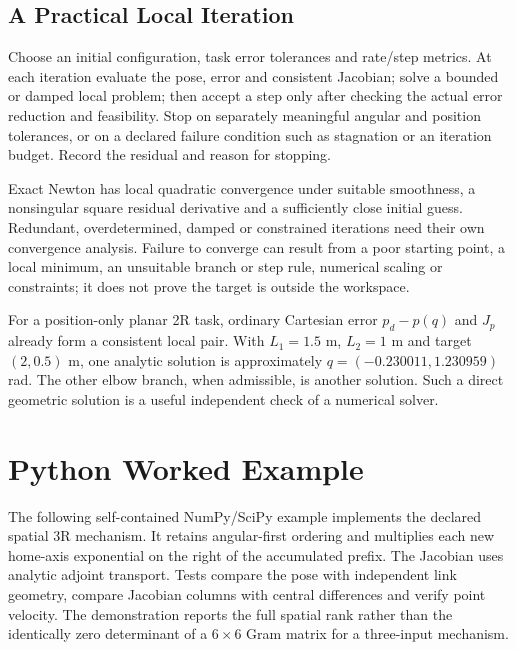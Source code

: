 \subsection{A Practical Local Iteration}
\label{subsec:ik_algorithm}

Choose an initial configuration, task error tolerances and rate/step metrics. At each iteration evaluate the pose, error and consistent Jacobian; solve a bounded or damped local problem; then accept a step only after checking the actual error reduction and feasibility. Stop on separately meaningful angular and position tolerances, or on a declared failure condition such as stagnation or an iteration budget. Record the residual and reason for stopping.

Exact Newton has local quadratic convergence under suitable smoothness, a nonsingular square residual derivative and a sufficiently close initial guess. Redundant, overdetermined, damped or constrained iterations need their own convergence analysis. Failure to converge can result from a poor starting point, a local minimum, an unsuitable branch or step rule, numerical scaling or constraints; it does not prove the target is outside the workspace.

For a position-only planar 2R task, ordinary Cartesian error $p_d-p(q)$ and $J_p$ already form a consistent local pair. With $L_1=1.5$ m, $L_2=1$ m and target $(2,0.5)$ m, one analytic solution is approximately $q=(-0.230011,1.230959)$ rad. The other elbow branch, when admissible, is another solution. Such a direct geometric solution is a useful independent check of a numerical solver.

\section{Python Worked Example}
\label{sec:python_example}

The following self-contained NumPy/SciPy example implements the declared spatial 3R mechanism. It retains angular-first ordering and multiplies each new home-axis exponential on the right of the accumulated prefix. The Jacobian uses analytic adjoint transport. Tests compare the pose with independent link geometry, compare Jacobian columns with central differences and verify point velocity. The demonstration reports the full spatial rank rather than the identically zero determinant of a $6\times6$ Gram matrix for a three-input mechanism.

